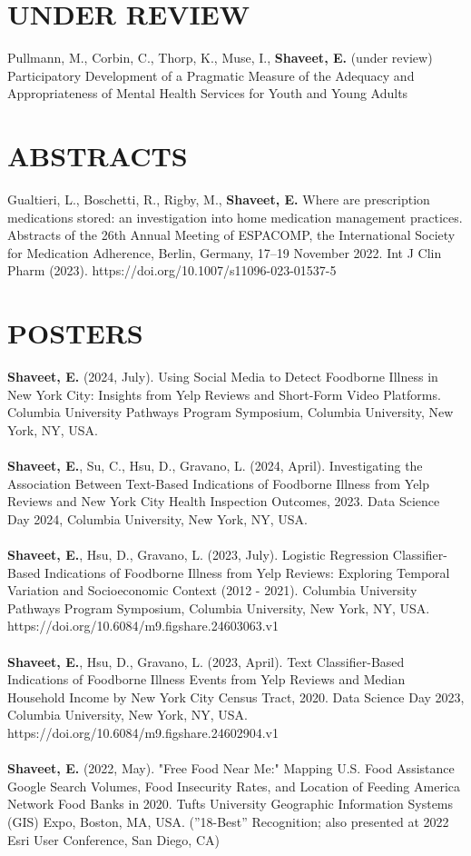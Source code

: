 \documentclass[a4paper,12pt]{article}
\begin{document}
{\section*{UNDER REVIEW}
Pullmann, M., Corbin, C., Thorp, K., Muse, I., \textbf{Shaveet, E.} (under review) Participatory Development of a Pragmatic Measure of the Adequacy and Appropriateness of Mental Health Services for Youth and Young Adults\\

\section*{ABSTRACTS}
Gualtieri, L., Boschetti, R., Rigby, M., \textbf{Shaveet, E.} Where are prescription medications stored: an investigation into home medication management practices. Abstracts of the 26th Annual Meeting of ESPACOMP, the International Society for Medication Adherence, Berlin, Germany, 17–19 November 2022. Int J Clin Pharm (2023). https://doi.org/10.1007/s11096-023-01537-5

\section*{POSTERS}

\textbf{Shaveet, E.} (2024, July). Using Social Media to Detect Foodborne Illness in New York City: Insights from Yelp Reviews and Short-Form Video Platforms. Columbia University Pathways Program Symposium, Columbia University, New York, NY, USA.\\
\\
\textbf{Shaveet, E.}, Su, C., Hsu, D., Gravano, L. (2024, April). Investigating the Association Between Text-Based Indications of Foodborne Illness from Yelp Reviews and New York City Health Inspection Outcomes, 2023. Data Science Day 2024, Columbia University, New York, NY, USA.\\
\\
\textbf{Shaveet, E.}, Hsu, D., Gravano, L. (2023, July). Logistic Regression Classifier-Based Indications of Foodborne Illness from Yelp Reviews: Exploring Temporal Variation and Socioeconomic Context (2012 - 2021). Columbia University Pathways Program Symposium, Columbia University, New York, NY, USA. \\https://doi.org/10.6084/m9.figshare.24603063.v1\\
\\
\textbf{Shaveet, E.}, Hsu, D., Gravano, L. (2023, April). Text Classifier-Based Indications of Foodborne Illness Events from Yelp Reviews and Median Household Income by New York City Census Tract, 2020. Data Science Day 2023, Columbia University, New York, NY, USA. https://doi.org/10.6084/m9.figshare.24602904.v1\\
\\
\textbf{Shaveet, E.} (2022, May). "Free Food Near Me:" Mapping U.S. Food Assistance Google Search Volumes, Food Insecurity Rates, and Location of Feeding America Network Food Banks in 2020. Tufts University Geographic Information Systems (GIS) Expo, Boston, MA, USA. (”18-Best” Recognition; also presented at 2022 Esri User Conference, San Diego, CA)

}
\end{document}
